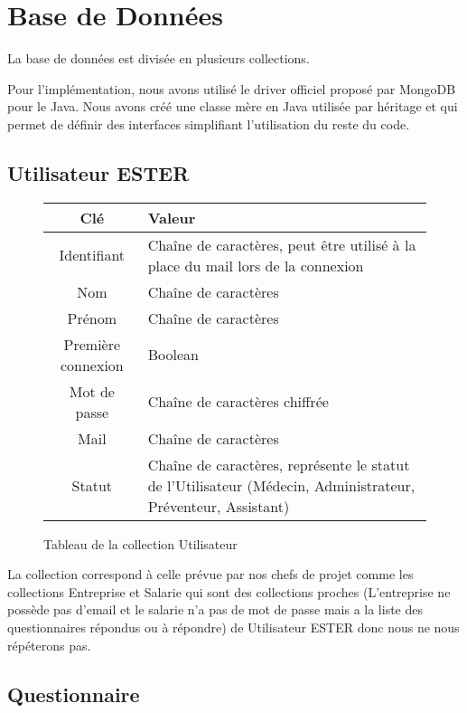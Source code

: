 \section{Base de Données}

La base de données est divisée en plusieurs collections.

Pour l'implémentation, nous avons utilisé le driver officiel proposé par MongoDB pour le Java. Nous avons créé une classe mère en Java utilisée par héritage et qui permet de définir des interfaces simplifiant l'utilisation du reste du code.

\subsection{Utilisateur ESTER}

\begin{figure}[H]
    \begin{center}
        \begin{tabularx}{17cm}{|c|X|}
            \hline
            Clé & Valeur  \tabularnewline 
            \hline
            Identifiant & 
            Chaîne de caractères, peut être utilisé à la place du mail lors de la connexion \tabularnewline 
            Nom & 
            Chaîne de caractères \tabularnewline
            Prénom & 
            Chaîne de caractères \tabularnewline
            Première connexion & 
            Boolean \tabularnewline
            Mot de passe & 
            Chaîne de caractères chiffrée \tabularnewline
            Mail & 
            Chaîne de caractères \tabularnewline
            Statut & 
            Chaîne de caractères, représente le statut de l'Utilisateur (Médecin, Administrateur,
            Préventeur, Assistant) \tabularnewline
            \hline
        \end{tabularx}
    \end{center}
    \caption{Tableau de la collection Utilisateur}
\end{figure}

La collection correspond à celle prévue par nos chefs de projet comme
les collections Entreprise et Salarie qui sont des collections proches (L'entreprise ne possède 
pas d'email et le salarie n'a pas de mot de passe mais a la liste des questionnaires répondus ou à répondre) de Utilisateur ESTER donc nous ne nous répéterons pas. 

\subsection{Questionnaire}


